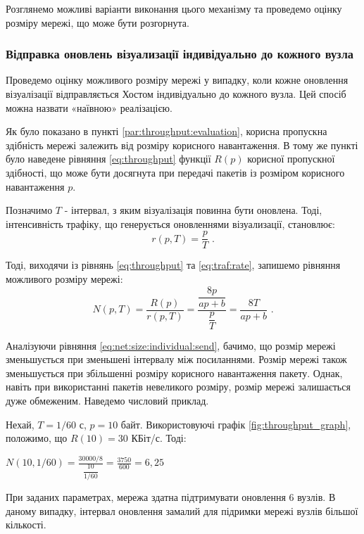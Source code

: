 \documentclass[a4paper,ukrainian,utf8,nocolumnsxix,floatsection,equationsection]{eskdtext}
\renewcommand\paragraph{\subsubsection}
\begin{document}
Розглянемо можливі варіанти виконання цього механізму та проведемо оцінку розміру мережі, що може бути розгорнута.

\paragraph{Відправка оновлень візуализації індивідуально до кожного вузла}
\label{par:individual:send}
Проведемо оцінку можливого розміру мережі у випадку, коли кожне оновлення візуалізації відправляється Хостом індивідуально до кожного вузла. Цей спосіб можна назвати «наївною» реалізацією.

Як було показано в пункті \ref{par:throughput:evaluation}, корисна пропускна здібність мережі залежить від розміру корисного навантаження. В тому же пункті було наведене рівняння \ref{eq:throughput} функції $R(p)$ корисної пропускної здібності, що може бути досягнута при передачі пакетів із розміром корисного навантаження $p$. 

Позначимо $T$ - інтервал, з яким візуалізація повинна бути оновлена. Тоді, інтенсивність трафіку, що генерується оновленнями візуализації, становлює:
\begin{equation}\label{eq:traf:rate}
	r(p, T) = \frac{p}{T}  \text{ .}
\end{equation}

Тоді, виходячи із рівнянь \ref{eq:throughput} та \ref{eq:traf:rate}, запишемо рівняння можливого розміру мережі:
\begin{equation}\label{eq:net:size:individual:send}
	N(p, T) = \frac{R(p)}{r(p, T)} = \frac{\dfrac{8p}{ap+b}}{\dfrac{p}{T}} = \frac{8T}{ap + b} \text{ .}
\end{equation}

Аналізуючи рівняння \ref{eq:net:size:individual:send}, бачимо, що розмір мережі зменьшується при зменьшені інтервалу між посиланнями. Розмір мережі також зменьшується при збільшенні розміру корисного навантаження пакету. Однак, навіть при використанні пакетів невеликого розміру, розмір мережі залишається дуже обмеженим. Наведемо числовий приклад.

Нехай, $T=1/60$ с, $p = 10$ байт. Використовуючі графік \ref{fig:throughput_graph}, положимо, що $R(10) = 30$ КБіт/с. Тоді:

$N(10, 1/60) = \frac{30000 / 8}{\dfrac{10}{1/60}} = \frac{3750}{600} = 6,25$


При заданих параметрах, мережа здатна підтримувати оновлення 6 вузлів. В даному випадку, інтервал оновлення замалий для підримки мережі вузлів більшої кількості.
\end{document}
